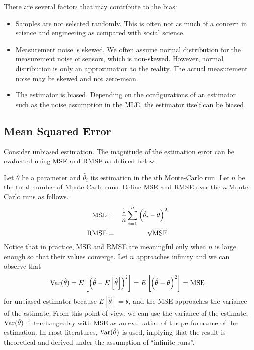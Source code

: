 There are several factors that may contribute to the bias:
\begin{itemize}
	\item Samples are not selected randomly. This is often not as much of a concern in science and engineering as compared with social science.
	\item Measurement noise is skewed. We often assume normal distribution for the measurement noise of sensors, which is non-skewed. However, normal distribution is only an approximation to the reality. The actual measurement noise may be skewed and not zero-mean.
	\item The estimator is biased. Depending on the configurations of an estimator such as the noise assumption in the MLE, the estimator itself can be biased.
\end{itemize}

\subsection{Mean Squared Error}

Consider unbiased estimation. The magnitude of the estimation error can be evaluated using MSE and RMSE as defined below. 

Let $\theta$ be a parameter and $\hat{\theta}_i$ its estimation in the $i$th Monte-Carlo run. Let $n$ be the total number of Monte-Carlo runs. Define MSE and RMSE over the $n$ Monte-Carlo runs as follows.
\begin{eqnarray}
	\textup{MSE} &=& \dfrac{1}{n}\sum_{i=1}^{n}\left(\hat{\theta}_i-\theta\right)^2 \nonumber \\
	\textup{RMSE} &=& \sqrt{\textup{MSE}} \nonumber
\end{eqnarray}
Notice that in practice, MSE and RMSE are meaningful only when $n$ is large enough so that their values converge. Let $n$ approaches infinity and we can observe that
\begin{eqnarray}
	\textup{Var}(\hat{\theta}) = E\left[\left(\hat{\theta}-E\left[\hat{\theta}\right]\right)^2\right] = E\left[\left(\hat{\theta}-\theta\right)^2\right] = \textup{MSE} \nonumber
\end{eqnarray}
for unbiased estimator because $E\left[\hat{\theta}\right]=\theta$, and the MSE approaches the variance of the estimate. From this point of view, we can use the variance of the estimate, $\textup{Var}(\hat{\theta})$, interchangeably with MSE as an evaluation of the performance of the estimation. In most literatures, $\textup{Var}(\hat{\theta})$ is used, implying that the result is theoretical and derived under the assumption of ``infinite runs''.

